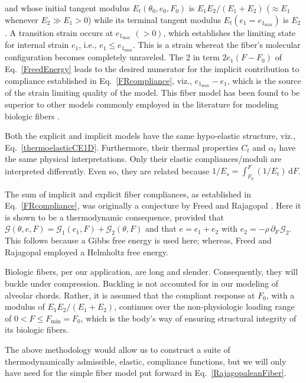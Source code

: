 and whose initial tangent modulus $E_t(\theta_0, e_0, F_0)$ is $E_1 E_2 / (E_1 + E_2)$ ($\approx E_1$ whenever $E_2 \gg E_1 > 0$) while its terminal tangent modulus $E_t(e_1 \! = \! e_{1_{\max}})$ is $E_2$.  A transition strain occurs at $e_{1_{\max}}$ $(> 0)$, which establishes the limiting state for internal strain $e_1$, i.e., $e_1 \leq e_{1_{\max}}$.  This is a strain whereat the fiber's molecular configuration becomes completely unraveled.  The 2 in term $2 e_1 (F - F_0)$ of Eq.~\ref{FreedEnergy} leads to the desired numerator for the implicit contribution to compliance established in Eq.~\ref{FRcompliance}, viz., $e_{1_{\max}} - e_1$, which is the source of the strain limiting quality of the model.  This fiber model has been found to be superior to other models commonly employed in the literature for modeling biologic fibers \cite{AkintundeMiller18,Robbinsetal20}.

Both the explicit and implicit models have the same hypo-elastic structure, viz., Eq.~\ref{thermoelasticCE1D}.  Furthermore, their thermal properties $C_t$ and $\alpha_t$ have the same physical interpretations. Only their elastic compliances\slash moduli are interpreted differently.  Even so, they are related because $1/E_s = \int_{F_0}^F (1/E_t) \, \mathrm{d}F$.

The sum of implicit and explicit fiber compliances, as established in Eq.~\ref{FRcompliance}, was originally a conjecture by Freed and Rajagopal \cite{FreedRajagopal16}.  Here it is shown to be a thermo\-dynamic consequence, provided that $\mathcal{G} ( \theta , e , F) = \mathcal{G}_1 ( e_1 , F ) + \mathcal{G}_2 ( \theta , F )$ and that $e = e_1 + e_2$ with $e_2 = - \rho \, \partial_{F\,} \mathcal{G}_2$.  This follows because a Gibbs free energy is used here; whereas, Freed and Rajagopal employed a Helmholtz free energy.

Biologic fibers, per our application, are long and slender.  Consequently, they will buckle under compression.  Buckling is not accounted for in our modeling of alveolar chords.  Rather, it is assumed that the compliant response at $F_0$, with a modulus of $E_1 E_2 / ( E_1 + E_2 )$, continues over the non-physiologic loading range of $0 < F \leq F_{\min} = F_0$, which is the body's way of ensuring structural integrity of its biologic fibers.

The above methodology would allow us to construct a suite of thermo\-dynamically admissible, elastic, compliance functions, but we will only have need for the simple fiber model put forward in Eq.~\ref{RajagopaleanFiber}.

